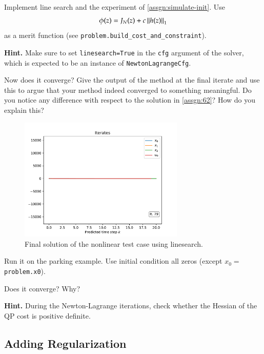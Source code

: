 \documentclass[]{article}
\begin{document}
\begin{assignment}
   Implement line search and the experiment of \cref{assgn:simulate-init}. 
   Use 
	\[ 
		\phi(z) = J_N(z) + c \left\|h(z)\right\|_1 
	\]
	as a merit function (see \texttt{problem.build\_cost\_and\_constraint}). 

	\textbf{Hint.} Make sure to set \texttt{linesearch=True} in the \texttt{cfg} argument of the solver, 
	which is expected to be an instance of \texttt{NewtonLagrangeCfg}.
	
   Now does it converge? Give the output of the method at the final iterate and use this 
   to argue that your method indeed converged to something meaningful. 
   Do you notice any difference with respect to the solution in \cref{assgn:62}? 
   How do you explain this?
\end{assignment}
\begin{figure}[H]
	\centering
	\includegraphics[width=0.7\textwidth]{images/Assignment6-4.pdf}
	\caption{Final solution of the nonlinear test case using linesearch.}
	\label{fig:assignment6_4}
\end{figure}



\begin{assignment}
   Run it on the parking example. Use initial condition all zeros (except $x_0 = $\texttt{problem.x0}).
   
	Does it converge? Why? 
	
	\textbf{Hint. } During the Newton-Lagrange iterations, check whether the Hessian of the QP cost is positive definite.
\end{assignment}



\subsection{Adding Regularization}
\end{document}
